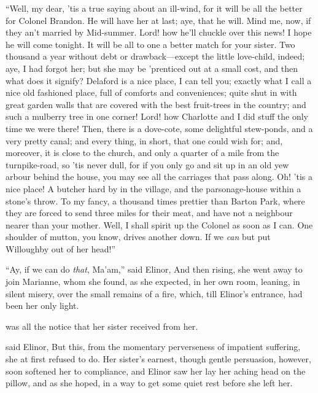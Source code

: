 “Well, my dear, 'tis a true saying about an ill-wind, for it will be all the better for Colonel Brandon. He will have her at last; aye, that he will. Mind me, now, if they an't married by Mid-summer. Lord! how he'll chuckle over this news! I hope he will come tonight. It will be all to one a better match for your sister. Two thousand a year without debt or drawback---except the little love-child, indeed; aye, I had forgot her; but she may be 'prenticed out at a small cost, and then what does it signify? Delaford is a nice place, I can tell you; exactly what I call a nice old fashioned place, full of comforts and conveniences; quite shut in with great garden walls that are covered with the best fruit-trees in the country; and such a mulberry tree in one corner! Lord! how Charlotte and I did stuff the only time we were there! Then, there is a dove-cote, some delightful stew-ponds, and a very pretty canal; and every thing, in short, that one could wish for; and, moreover, it is close to the church, and only a quarter of a mile from the turnpike-road, so 'tis never dull, for if you only go and sit up in an old yew arbour behind the house, you may see all the carriages that pass along. Oh! 'tis a nice place! A butcher hard by in the village, and the parsonage-house within a stone's throw. To my fancy, a thousand times prettier than Barton Park, where they are forced to send three miles for their meat, and have not a neighbour nearer than your mother. Well, I shall spirit up the Colonel as soon as I can. One shoulder of mutton, you know, drives another down. If we {\em can} but put Willoughby out of her head!”

“Ay, if we can do {\em that}, Ma'am,” said Elinor,  And then rising, she went away to join Marianne, whom she found, as she expected, in her own room, leaning, in silent misery, over the small remains of a fire, which, till Elinor's entrance, had been her only light.

 was all the notice that her sister received from her.

 said Elinor,  But this, from the momentary perverseness of impatient suffering, she at first refused to do. Her sister's earnest, though gentle persuasion, however, soon softened her to compliance, and Elinor saw her lay her aching head on the pillow, and as she hoped, in a way to get some quiet rest before she left her.

